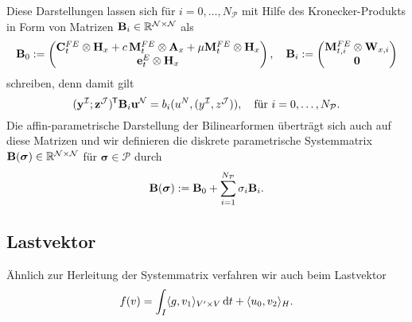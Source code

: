 \documentclass[../main.tex]{subfiles}
\begin{document}
Diese Darstellungen lassen sich für $i = 0, \dots, N_{\mathcal P}$ mit Hilfe des Kronecker-Produkts in Form von Matrizen $\mathbf{B}_{i} \in \mathbb{R}^{\mathcal N \times \mathcal N}$ als
\begin{equation}
    \mathbf{B}_{0} := \begin{pmatrix}
    \mathbf{C}_{t}^{FE} \otimes \mathbf{H}_{x} + c\,\mathbf{M}_{t}^{FE} \otimes \mathbf{A}_{x} + \mu \mathbf{M}_{t}^{FE} \otimes \mathbf{H}_{x} \\
    \mathbf{e}_{t}^{E} \otimes \mathbf{H}_{x}
    \end{pmatrix}, \quad
    \mathbf{B}_{i} :=  \begin{pmatrix}
    \mathbf{M}_{t,i}^{FE} \otimes \mathbf{W}_{x,i} \\
    \mathbf{0}
    \end{pmatrix}
\end{equation}
schreiben, denn damit gilt
\begin{equation}
    (\mathbf{y}^{\mathcal I}; \mathbf{z}^{\mathcal J})^{\mkern-1.5mu\mathsf{T}} \mathbf{B}_{i} \mathbf{u}^{\mathcal N} = b_{i}(u^{N}, (y^{\mathcal I}, z^{\mathcal J})), \quad \text{für } i = 0, \dots, N_{\mathcal P}.
\end{equation}
Die affin-parametrische Darstellung der Bilinearformen überträgt sich auch auf diese Matrizen und wir definieren die diskrete parametrische Systemmatrix $\mathbf{B}(\bm \sigma) \in \mathbb{R}^{\mathcal N \times \mathcal N}$ für $\bm \sigma \in \mathcal P$ durch
\begin{equation}
    \mathbf{B}(\bm \sigma) := \mathbf{B}_{0} + \sum_{i = 1}^{N_{\mathcal P}} \sigma_{i} \mathbf{B}_{i}.
\end{equation}


\subsection*{Lastvektor} %

Ähnlich zur Herleitung der Systemmatrix verfahren wir auch beim Lastvektor
\begin{equation}
    f(v) = \int_{I} \langle g,v_{1}\rangle_{V' \times V} \mathop{}\!\mathrm{d} t + \langle u_{0},v_{2}\rangle_{H}.
\end{equation}
\end{document}
